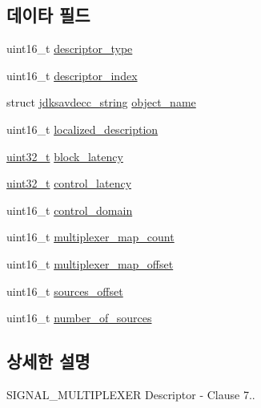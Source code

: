 \subsection*{데이타 필드}
\begin{DoxyCompactItemize}
\item 
uint16\+\_\+t \hyperlink{structjdksavdecc__descriptor__signal__multiplexer_ab7c32b6c7131c13d4ea3b7ee2f09b78d}{descriptor\+\_\+type}
\item 
uint16\+\_\+t \hyperlink{structjdksavdecc__descriptor__signal__multiplexer_a042bbc76d835b82d27c1932431ee38d4}{descriptor\+\_\+index}
\item 
struct \hyperlink{structjdksavdecc__string}{jdksavdecc\+\_\+string} \hyperlink{structjdksavdecc__descriptor__signal__multiplexer_a7d1f5945a13863b1762fc6db74fa8f80}{object\+\_\+name}
\item 
uint16\+\_\+t \hyperlink{structjdksavdecc__descriptor__signal__multiplexer_a0926f846ca65a83ad5bb06b4aff8f408}{localized\+\_\+description}
\item 
\hyperlink{parse_8c_a6eb1e68cc391dd753bc8ce896dbb8315}{uint32\+\_\+t} \hyperlink{structjdksavdecc__descriptor__signal__multiplexer_ae2e9f0088d5e900b610d1b2818dfc559}{block\+\_\+latency}
\item 
\hyperlink{parse_8c_a6eb1e68cc391dd753bc8ce896dbb8315}{uint32\+\_\+t} \hyperlink{structjdksavdecc__descriptor__signal__multiplexer_ab2bd4639caaf9a8078b68368afbd63b6}{control\+\_\+latency}
\item 
uint16\+\_\+t \hyperlink{structjdksavdecc__descriptor__signal__multiplexer_a8937b22996b7c28ae209f29fe777f03a}{control\+\_\+domain}
\item 
uint16\+\_\+t \hyperlink{structjdksavdecc__descriptor__signal__multiplexer_a8c745eab00eb9dc3d107fc00233fd861}{multiplexer\+\_\+map\+\_\+count}
\item 
uint16\+\_\+t \hyperlink{structjdksavdecc__descriptor__signal__multiplexer_a2087871da25af7c05f775543cc959969}{multiplexer\+\_\+map\+\_\+offset}
\item 
uint16\+\_\+t \hyperlink{structjdksavdecc__descriptor__signal__multiplexer_ac9ce4e1b642e6654d49504898dbe738d}{sources\+\_\+offset}
\item 
uint16\+\_\+t \hyperlink{structjdksavdecc__descriptor__signal__multiplexer_a1af3a7f3729937d5da218737ba5b2483}{number\+\_\+of\+\_\+sources}
\end{DoxyCompactItemize}


\subsection{상세한 설명}
S\+I\+G\+N\+A\+L\+\_\+\+M\+U\+L\+T\+I\+P\+L\+E\+X\+ER Descriptor -\/ Clause 7.. 

